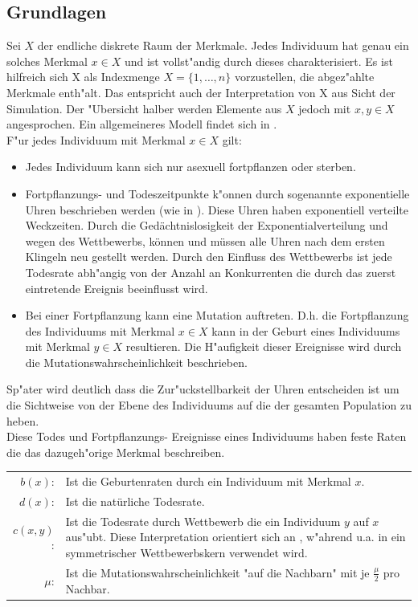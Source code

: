 \documentclass[11pt, a4paper, german]{article}
\theoremstyle{plain}
\begin{document}
	\subsection{Grundlagen}
	Sei $ X $ der endliche diskrete Raum der Merkmale. Jedes Individuum hat genau ein solches Merkmal $ x \in X $ und ist vollst"andig durch dieses charakterisiert. Es ist hilfreich sich X als Indexmenge $ X = \{1,\dots, n\} $ vorzustellen, die abgez"ahlte Merkmale enth"alt. Das entspricht auch der Interpretation von X aus Sicht der Simulation. Der "Ubersicht halber werden Elemente aus $ X $ jedoch mit $ x,y \in X $ angesprochen. Ein allgemeineres Modell findet sich in \cite{raey}.\\
	F"ur jedes Individuum mit Merkmal $ x \in X $ gilt:
	\begin{itemize}
		\item Jedes Individuum kann sich nur asexuell fortpflanzen oder sterben.
		\item Fortpflanzungs- und Todeszeitpunkte k"onnen durch sogenannte exponentielle Uhren beschrieben werden (wie in \cite[S. 3]{fournier2004microscopic}). Diese Uhren haben exponentiell verteilte Weckzeiten. Durch die Gedächtnislosigkeit der Exponentialverteilung und wegen des Wettbewerbs, können und müssen alle Uhren nach dem ersten Klingeln neu gestellt werden. Durch den Einfluss des Wettbewerbs ist jede Todesrate abh"angig von der Anzahl an Konkurrenten die durch das zuerst eintretende Ereignis beeinflusst wird. 
		\item Bei einer Fortpflanzung kann eine Mutation auftreten. D.h. die Fortpflanzung des Individuums mit Merkmal $ x \in X $ kann in der Geburt eines Individuums mit Merkmal $ y \in X $ resultieren. Die H"aufigkeit dieser Ereignisse wird durch die Mutationswahrscheinlichkeit beschrieben.
	\end{itemize}
	Sp"ater wird deutlich dass die Zur"uckstellbarkeit der Uhren entscheiden ist um die Sichtweise von der Ebene des Individuums auf die der gesamten Population zu heben.\\
	Diese Todes und Fortpflanzungs- Ereignisse eines Individuums haben feste Raten die das dazugeh"orige Merkmal beschreiben.\\
	
	\begin{tabular}{r p{26em}}
		$ b(x) $: & Ist die Geburtenraten durch ein Individuum mit Merkmal $ x $.\\
		$ d(x) $: & Ist die natürliche Todesrate.\\
		$ c(x, y) $: & Ist die Todesrate durch Wettbewerb die ein Individuum $ y $ auf $ x $ aus"ubt. Diese Interpretation orientiert sich an \cite{raey}, w"ahrend u.a. in \cite{Champagnat20061127} ein symmetrischer Wettbewerbskern verwendet wird.\\
		$ \mu $: & Ist die Mutationswahrscheinlichkeit "{}auf die Nachbarn"{} mit je $ \frac{\mu}{2} $ pro Nachbar. \\
	\end{tabular}\\
\end{document}
